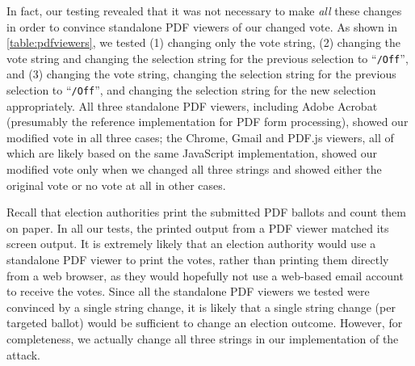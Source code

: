 \documentclass{article}
\begin{document}
In fact, our testing revealed that it was not necessary to make
\emph{all} these changes in order to convince standalone PDF viewers
of our changed vote. As shown in \autoref{table:pdfviewers}, we tested
(1) changing only the vote string, (2) changing the vote string and
changing the selection string for the previous selection to
``\texttt{/Off}'', and (3) changing the vote string, changing the
selection string for the previous selection to ``\texttt{/Off}'', and
changing the selection string for the new selection appropriately. All
three standalone PDF viewers, including Adobe Acrobat (presumably the
reference implementation for PDF form processing), showed our modified
vote in all three cases; the Chrome, Gmail and PDF.js viewers, all of
which are likely based on the same JavaScript implementation, showed
our modified vote only when we changed all three strings and showed
either the original vote or no vote at all in other cases.

Recall that election authorities print the submitted PDF ballots and
count them on paper. In all our tests, the printed output from a PDF
viewer matched its screen output. It is extremely likely that an
election authority would use a standalone PDF viewer to print the
votes, rather than printing them directly from a web browser, as they
would hopefully not use a web-based email account to receive the
votes. Since all the standalone PDF viewers we tested were convinced
by a single string change, it is likely that a single string change
(per targeted ballot) would be sufficient to change an election
outcome. However, for completeness, we actually change all three
strings in our implementation of the attack.
\end{document}
